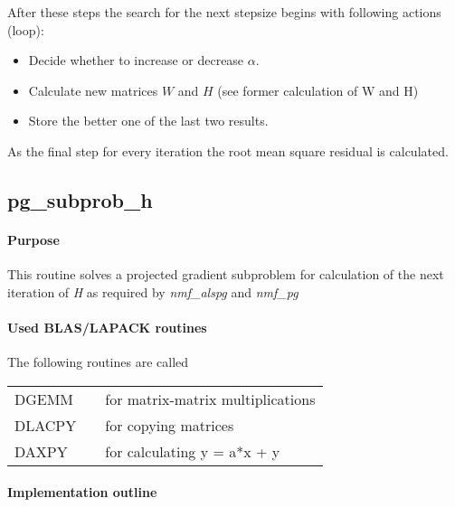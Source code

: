 \documentclass[a4paper,10pt]{scrartcl}
\begin{document}
					After these steps the search for the next stepsize begins with following
					actions (loop):\newline

					\begin{itemize}
					 \item Decide whether to increase or decrease $\alpha$.\newline
					 \item Calculate new matrices $W$ and $H$ (see former calculation of W and 
						H)\newline
					 \item Store the better one of the last two results.\newline
					\end{itemize}


					As the final step for every iteration the root mean square residual is
					calculated.\newline


		\subsection{pg\_subprob\_h}


			\paragraph{Purpose}


				
					This routine solves a projected gradient subproblem for calculation of  the next iteration of \emph{H} as required by \emph{nmf\_alspg} and \emph{nmf\_pg} \newline


			\paragraph{Used BLAS/LAPACK routines}

					The following routines are called\newline

					\begin{tabular}{lcl}
						DGEMM && for matrix-matrix multiplications\\
						DLACPY && for copying matrices\\
						DAXPY && for calculating y = a*x + y\\
					\end{tabular}

			\paragraph{Implementation outline}
\end{document}
